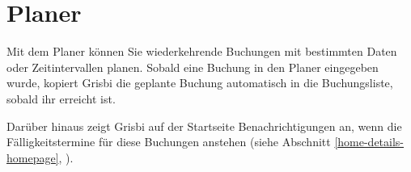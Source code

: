

\chapter{Planer\label{plannedtransactions}}

Mit dem Planer können Sie wiederkehrende Buchungen mit bestimmten Daten oder Zeitintervallen planen. Sobald eine Buchung in den Planer eingegeben wurde, kopiert Grisbi die geplante Buchung automatisch in die Buchungsliste, sobald ihr  erreicht ist.


Darüber hinaus zeigt Grisbi auf der Startseite Benachrichtigungen an, wenn die Fälligkeitstermine für diese Buchungen anstehen (siehe Abschnitt \vref{home-details-homepage}, ).

